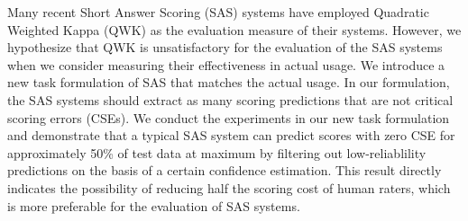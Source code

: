 Many recent Short Answer Scoring (SAS) systems have employed Quadratic Weighted Kappa (QWK) as the evaluation measure of their systems. However, we hypothesize that QWK is unsatisfactory for the evaluation of the SAS systems when we consider measuring their effectiveness in actual usage. We introduce a new task formulation of SAS that matches the actual usage. In our formulation, the SAS systems should extract as many scoring predictions that are not critical scoring errors (CSEs). We conduct the experiments in our new task formulation and demonstrate that a typical SAS system can predict scores with zero CSE for approximately 50\% of test data at maximum by filtering out low-reliablility predictions on the basis of a certain confidence estimation. This result directly indicates the possibility of reducing half the scoring cost of human raters, which is more preferable for the evaluation of SAS systems.
